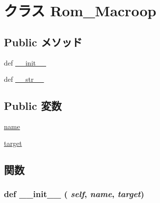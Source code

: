 \hypertarget{classmicro__asm_1_1Rom__Macroop}{
\section{クラス Rom\_\-Macroop}
\label{classmicro__asm_1_1Rom__Macroop}
}
\subsection*{Public メソッド}
\begin{DoxyCompactItemize}
\item 
def \hyperlink{classmicro__asm_1_1Rom__Macroop_ac775ee34451fdfa742b318538164070e}{\_\-\_\-init\_\-\_\-}
\item 
def \hyperlink{classmicro__asm_1_1Rom__Macroop_aa7a4b9bc0941308e362738503137460e}{\_\-\_\-str\_\-\_\-}
\end{DoxyCompactItemize}
\subsection*{Public 変数}
\begin{DoxyCompactItemize}
\item 
\hyperlink{classmicro__asm_1_1Rom__Macroop_ab74e6bf80237ddc4109968cedc58c151}{name}
\item 
\hyperlink{classmicro__asm_1_1Rom__Macroop_a5d2c023108742a1ce78ba9823c06ea35}{target}
\end{DoxyCompactItemize}


\subsection{関数}
\hypertarget{classmicro__asm_1_1Rom__Macroop_ac775ee34451fdfa742b318538164070e}{
\subsubsection[{\_\-\_\-init\_\-\_\-}]{\setlength{\rightskip}{0pt plus 5cm}def \_\-\_\-init\_\-\_\- ( {\em self}, \/   {\em name}, \/   {\em target})}}
\label{classmicro__asm_1_1Rom__Macroop_ac775ee34451fdfa742b318538164070e}



